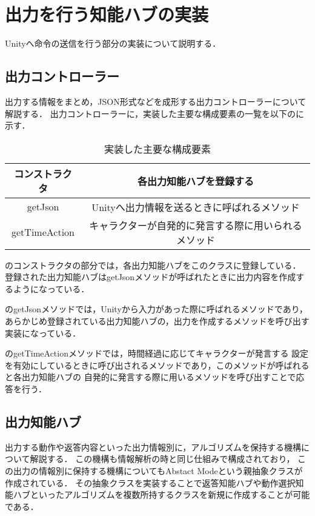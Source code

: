 
\section{出力を行う知能ハブの実装}
Unityへ命令の送信を行う部分の実装について説明する．

\subsection{出力コントローラー}
出力する情報をまとめ，JSON形式などを成形する出力コントローラーについて解説する．
出力コントローラーに，実装した主要な構成要素の一覧を以下のに示す．

\begin{table}[tbh]
	\caption{実装した主要な構成要素} \label{tab:OutputController}
	\begin{center}
		\begin{tabular}[htb]{c|c}
		\hline
		コンストラクタ & 各出力知能ハブを登録する \\
		\hline
		getJson & Unityへ出力情報を送るときに呼ばれるメソッド \\
		\hline
		getTimeAction & キャラクターが自発的に発言する際に用いられるメソッド \\
		\hline
		\end{tabular}
	\end{center}
\end{table}

のコンストラクタの部分では，各出力知能ハブをこのクラスに登録している．
登録された出力知能ハブはgetJsonメソッドが呼ばれたときに出力内容を作成するようになっている．

のgetJsonメソッドでは，Unityから入力があった際に呼ばれるメソッドであり，
あらかじめ登録されている出力知能ハブの，出力を作成するメソッドを呼び出す実装になっている．

のgetTimeActionメソッドでは，時間経過に応じてキャラクターが発言する
設定を有効にしているときに呼び出されるメソッドであり，このメソッドが呼ばれると各出力知能ハブの
自発的に発言する際に用いるメソッドを呼び出すことで応答を行う．

\subsection{出力知能ハブ}
出力する動作や返答内容といった出力情報別に，アルゴリズムを保持する機構について解説する．
この機構も情報解析の時と同じ仕組みで構成されており，
この出力の情報別に保持する機構についてもAbstact Modeという親抽象クラスが作成されている．
その抽象クラスを実装することで返答知能ハブや動作選択知能ハブといったアルゴリズムを複数所持するクラスを新規に作成することが可能である．

